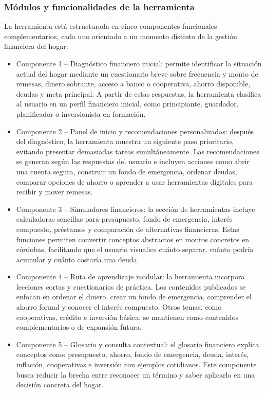 \documentclass[12pt,letterpaper]{article}
\providecommand{\tightlist}{\setlength{\itemsep}{0pt}\setlength{\parskip}{0pt}}
\begin{document}
\subsubsection{\texorpdfstring{\textbf{Módulos y funcionalidades de la herramienta}}{Módulos y funcionalidades de la herramienta}}\label{muxf3dulos-y-funcionalidades-de-la-herramienta}

La herramienta está estructurada en cinco componentes funcionales complementarios, cada uno orientado a un momento distinto de la gestión financiera del hogar:

\begin{itemize}
\tightlist
\item
  Componente 1 -- Diagnóstico financiero inicial: permite identificar la situación actual del hogar mediante un cuestionario breve sobre frecuencia y monto de remesas, dinero sobrante, acceso a banco o cooperativa, ahorro disponible, deudas y meta principal. A partir de estas respuestas, la herramienta clasifica al usuario en un perfil financiero inicial, como principiante, guardador, planificador o inversionista en formación.
\item
  Componente 2 -- Panel de inicio y recomendaciones personalizadas: después del diagnóstico, la herramienta muestra un siguiente paso prioritario, evitando presentar demasiadas tareas simultáneamente. Las recomendaciones se generan según las respuestas del usuario e incluyen acciones como abrir una cuenta segura, construir un fondo de emergencia, ordenar deudas, comparar opciones de ahorro o aprender a usar herramientas digitales para recibir y mover remesas.
\item
  Componente 3 -- Simuladores financieros: la sección de herramientas incluye calculadoras sencillas para presupuesto, fondo de emergencia, interés compuesto, préstamos y comparación de alternativas financieras. Estas funciones permiten convertir conceptos abstractos en montos concretos en córdobas, facilitando que el usuario visualice cuánto separar, cuánto podría acumular y cuánto costaría una deuda.
\item
  Componente 4 -- Ruta de aprendizaje modular: la herramienta incorpora lecciones cortas y cuestionarios de práctica. Los contenidos publicados se enfocan en ordenar el dinero, crear un fondo de emergencia, comprender el ahorro formal y conocer el interés compuesto. Otros temas, como cooperativas, crédito e inversión básica, se mantienen como contenidos complementarios o de expansión futura.
\item
  Componente 5 -- Glosario y consulta contextual: el glosario financiero explica conceptos como presupuesto, ahorro, fondo de emergencia, deuda, interés, inflación, cooperativas e inversión con ejemplos cotidianos. Este componente busca reducir la brecha entre reconocer un término y saber aplicarlo en una decisión concreta del hogar.
\end{itemize}
\end{document}

